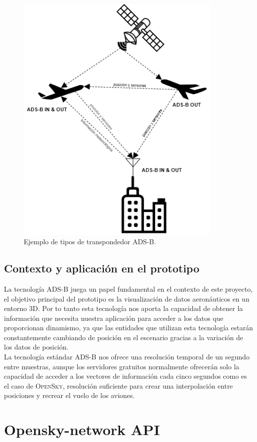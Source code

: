 \documentclass[a4paper, 11pt]{book}
\begin{document}
\begin{figure}[h]
  \centering
  \includegraphics[width=10cm, keepaspectratio]{img/adsbtypes.drawio.png}
  \caption{Ejemplo de tipos de transpondedor ADS-B.}
  \label{fig:adsbtypes}
\end{figure}
\subsection{Contexto y aplicación en el prototipo}
La tecnología \textsc{ADS-B} juega un papel fundamental en el contexto de este proyecto, el objetivo principal del prototipo es la visualización de datos aeronáuticos en un entorno \textsc{3D}. Por to tanto esta tecnología nos aporta la capacidad de obtener la información que necesita nuestra aplicación para acceder a los datos que proporcionan dinamismo, ya que las entidades que utilizan esta tecnología estarán constantemente cambiando de posición en el escenario gracias a la variación de los datos de posición.\\
La tecnología estándar \textsc{ADS-B} nos ofrece una resolución temporal de un segundo entre muestras, aunque los servidores gratuitos normalmente ofrecerán solo la capacidad de acceder a los vectores de información cada cinco segundos como es el caso de \textsc{OpenSky}, resolución suficiente para crear una interpolación entre posiciones y recrear el vuelo de los aviones.\\
\section{Opensky-network API}
\label{sec:opensky}
\end{document}
